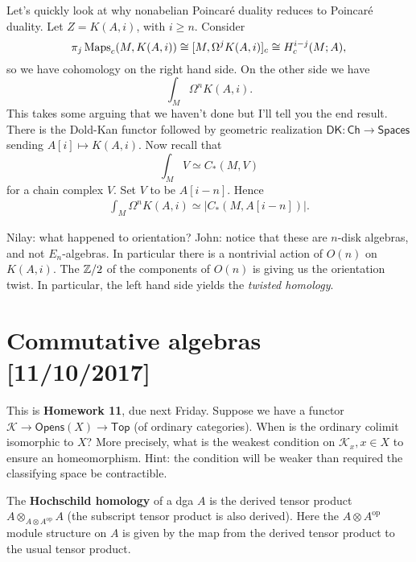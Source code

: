 \documentclass{amsart}
\begin{document}
\begin{remark}
    Let's quickly look at why nonabelian Poincar\'e duality reduces to Poincar\'e duality.
    Let $Z=K(A,i)$, with $i\geq n$. Consider
    \begin{equation*}
        \pi_j\operatorname{Maps}_c(M,K(A,i)) \cong [M, \Omega^jK(A,i)]_c \cong H^{i-j}_c(M;A),
    \end{equation*}
    so we have cohomology on the right hand side. On the other side we have
    \begin{equation*}
        \int_M \Omega^nK(A,i).
    \end{equation*}
    This takes some arguing that we haven't done but I'll tell you the end result.
    There is the Dold-Kan functor followed by geometric realization
    $\mathsf{DK}:\mathsf{Ch}\to\mathsf{Spaces}$ sending $A[i]\mapsto K(A,i)$. Now recall that
    \begin{equation*}
        \int_M V \simeq C_*(M,V)
    \end{equation*}
    for a chain complex $V$. Set $V$ to be $A[i-n]$. Hence
    \begin{align*}
        \int_M \Omega^n K(A,i) \simeq |C_*(M, A[i-n])|.
    \end{align*}

    Nilay: what happened to orientation?
    John: notice that these are $n$-disk algebras, and not $E_n$-algebras. In particular
    there is a nontrivial action of $O(n)$ on $K(A,i)$. The $\mathbb{Z}/2$ of the components of
    $O(n)$ is giving us the orientation twist. In particular, the left hand side yields
    the \textit{twisted homology}.
\end{remark}

\newpage

\section{Commutative algebras [11/10/2017]}

\begin{exercise}
    This is \textbf{Homework 11}, due next Friday.
    Suppose we have a functor $\mathcal{K}\to \mathsf{Opens}(X)\to\mathsf{Top}$
    (of ordinary categories). When is the ordinary colimit isomorphic to $X$? More precisely, what is the weakest
    condition on $\mathcal{K}_x, x\in X$ to ensure an homeomorphism. Hint: the condition will be weaker
    than required the classifying space be contractible.
\end{exercise}

\begin{definition}
    The \textbf{Hochschild homology} of a dga $A$ is the derived tensor product
    $A\otimes_{A\otimes A^\text{op}} A$ (the subscript tensor product is also derived).
    Here the $A\otimes A^\text{op}$ module structure on $A$ is given by the map
    from the derived tensor product to the usual tensor product.
\end{definition}
\end{document}
